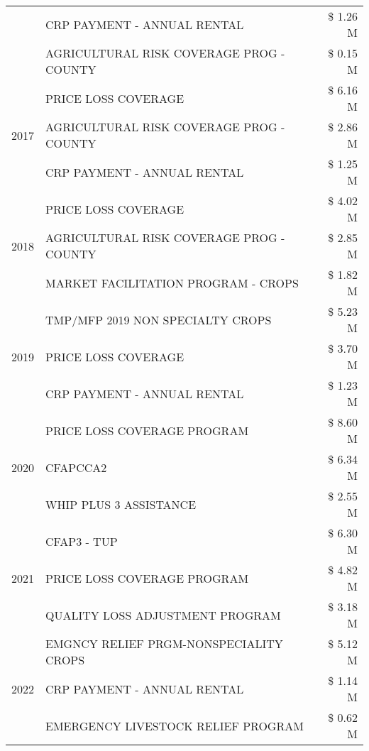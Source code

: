 \begin{tabular}{llr}
 & CRP PAYMENT - ANNUAL RENTAL & \$ 1.26 M \\
 & AGRICULTURAL RISK COVERAGE PROG - COUNTY & \$ 0.15 M \\
\cline{1-3}
\multirow[t]{3}{*}{2017} & PRICE LOSS COVERAGE & \$ 6.16 M \\
 & AGRICULTURAL RISK COVERAGE PROG - COUNTY & \$ 2.86 M \\
 & CRP PAYMENT - ANNUAL RENTAL & \$ 1.25 M \\
\cline{1-3}
\multirow[t]{3}{*}{2018} & PRICE LOSS COVERAGE & \$ 4.02 M \\
 & AGRICULTURAL RISK COVERAGE PROG - COUNTY & \$ 2.85 M \\
 & MARKET FACILITATION PROGRAM - CROPS & \$ 1.82 M \\
\cline{1-3}
\multirow[t]{3}{*}{2019} & TMP/MFP 2019 NON SPECIALTY CROPS & \$ 5.23 M \\
 & PRICE LOSS COVERAGE & \$ 3.70 M \\
 & CRP PAYMENT - ANNUAL RENTAL & \$ 1.23 M \\
\cline{1-3}
\multirow[t]{3}{*}{2020} & PRICE LOSS COVERAGE PROGRAM & \$ 8.60 M \\
 & CFAPCCA2 & \$ 6.34 M \\
 & WHIP PLUS 3 ASSISTANCE & \$ 2.55 M \\
\cline{1-3}
\multirow[t]{3}{*}{2021} & CFAP3 - TUP & \$ 6.30 M \\
 & PRICE LOSS COVERAGE PROGRAM & \$ 4.82 M \\
 & QUALITY LOSS ADJUSTMENT PROGRAM & \$ 3.18 M \\
\cline{1-3}
\multirow[t]{3}{*}{2022} & EMGNCY RELIEF PRGM-NONSPECIALITY CROPS & \$ 5.12 M \\
 & CRP PAYMENT - ANNUAL RENTAL & \$ 1.14 M \\
 & EMERGENCY LIVESTOCK RELIEF PROGRAM & \$ 0.62 M \\
\cline{1-3}
\bottomrule
\end{tabular}
